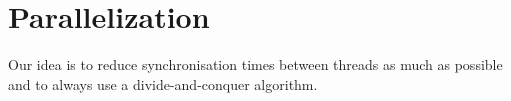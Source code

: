 \section{Parallelization}\label{parallelization}

Our idea is to reduce synchronisation times between threads as much as possible and to always use a divide-and-conquer algorithm.


\FloatBarrier